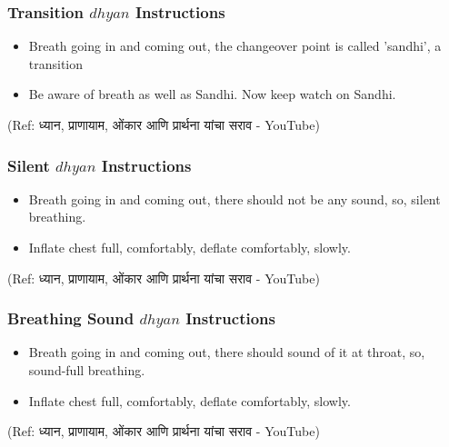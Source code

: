 \begin{frame}[fragile]\frametitle{Transition $dhyan$ Instructions}

	\begin{itemize}
	\item Breath going in and coming out, the changeover point is called 'sandhi', a transition
	\item Be aware of breath as well as Sandhi. Now keep watch on Sandhi.
	\end{itemize}

{\tiny (Ref:  ध्यान, प्राणायाम, ओंकार आणि प्रार्थना यांचा सराव - YouTube)}

\end{frame}

\begin{frame}[fragile]\frametitle{Silent $dhyan$ Instructions}

	\begin{itemize}
	\item Breath going in and coming out, there should not be any sound, so, silent breathing.
	\item Inflate chest full, comfortably, deflate comfortably, slowly.
	\end{itemize}

{\tiny (Ref:  ध्यान, प्राणायाम, ओंकार आणि प्रार्थना यांचा सराव - YouTube)}

\end{frame}

\begin{frame}[fragile]\frametitle{Breathing Sound $dhyan$ Instructions}

	\begin{itemize}
	\item Breath going in and coming out, there should sound of it at throat, so, sound-full breathing.
	\item Inflate chest full, comfortably, deflate comfortably, slowly.
	\end{itemize}

{\tiny (Ref:  ध्यान, प्राणायाम, ओंकार आणि प्रार्थना यांचा सराव - YouTube)}

\end{frame}

